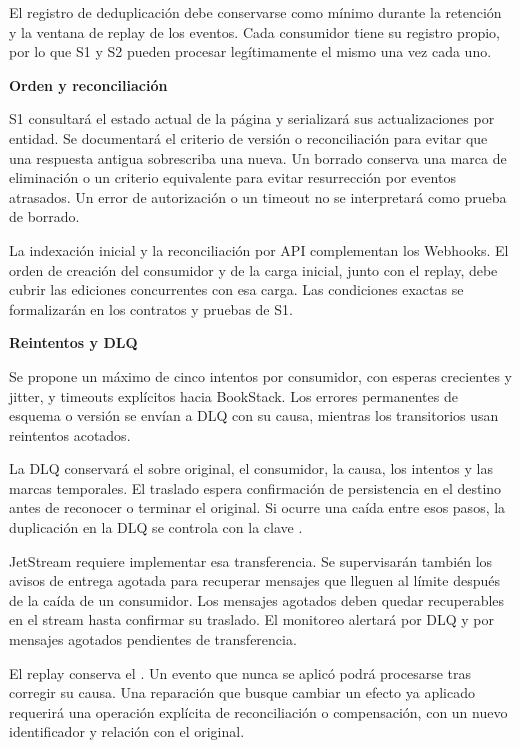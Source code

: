 El registro de deduplicación debe conservarse como mínimo durante la retención y la ventana de replay de los eventos. Cada consumidor tiene su registro propio, por lo que S1 y S2 pueden procesar legítimamente el mismo  una vez cada uno.

\par\medskip\noindent\textbf{Orden y reconciliación}\par\nobreak\smallskip

S1 consultará el estado actual de la página y serializará sus actualizaciones por entidad. Se documentará el criterio de versión o reconciliación para evitar que una respuesta antigua sobrescriba una nueva. Un borrado conserva una marca de eliminación o un criterio equivalente para evitar resurrección por eventos atrasados. Un error de autorización o un timeout no se interpretará como prueba de borrado.

La indexación inicial y la reconciliación por API complementan los Webhooks. El orden de creación del consumidor y de la carga inicial, junto con el replay, debe cubrir las ediciones concurrentes con esa carga. Las condiciones exactas se formalizarán en los contratos y pruebas de S1.

\par\medskip\noindent\textbf{Reintentos y DLQ}\par\nobreak\smallskip

Se propone un máximo de cinco intentos por consumidor, con esperas crecientes y jitter, y timeouts explícitos hacia BookStack. Los errores permanentes de esquema o versión se envían a DLQ con su causa, mientras los transitorios usan reintentos acotados.

La DLQ conservará el sobre original, el consumidor, la causa, los intentos y las marcas temporales. El traslado espera confirmación de persistencia en el destino antes de reconocer o terminar el original. Si ocurre una caída entre esos pasos, la duplicación en la DLQ se controla con la clave .

JetStream requiere implementar esa transferencia. Se supervisarán también los avisos de entrega agotada para recuperar mensajes que lleguen al límite después de la caída de un consumidor. Los mensajes agotados deben quedar recuperables en el stream hasta confirmar su traslado. El monitoreo alertará por DLQ y por mensajes agotados pendientes de transferencia.

El replay conserva el . Un evento que nunca se aplicó podrá procesarse tras corregir su causa. Una reparación que busque cambiar un efecto ya aplicado requerirá una operación explícita de reconciliación o compensación, con un nuevo identificador y relación con el original.

